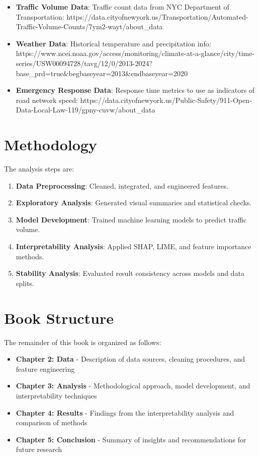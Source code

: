 \documentclass[
  letterpaper,
  DIV=11,
  numbers=noendperiod]{scrreprt}
\providecommand{\tightlist}{%
  \setlength{\itemsep}{0pt}\setlength{\parskip}{0pt}}\usepackage{longtable,booktabs,array}
\begin{document}
\begin{itemize}
\tightlist
\item
  \textbf{Traffic Volume Data}: Traffic count data from NYC Department
  of Transportation:
  https://data.cityofnewyork.us/Transportation/Automated-Traffic-Volume-Counts/7ym2-wayt/about\_data
\item
  \textbf{Weather Data}: Historical temperature and precipitation info:
  https://www.ncei.noaa.gov/access/monitoring/climate-at-a-glance/city/time-series/USW00094728/tavg/12/0/2013-2024?base\_prd=true\&begbaseyear=2013\&endbaseyear=2020
\item
  \textbf{Emergency Response Data}: Response time metrics to use as
  indicators of road network speed:
  https://data.cityofnewyork.us/Public-Safety/911-Open-Data-Local-Law-119/gpny-cuvw/about\_data
\end{itemize}

\section{Methodology}\label{methodology}

The analysis steps are:

\begin{enumerate}
\def\labelenumi{\arabic{enumi}.}
\tightlist
\item
  \textbf{Data Preprocessing}: Cleaned, integrated, and engineered
  features.
\item
  \textbf{Exploratory Analysis}: Generated visual summaries and
  statistical checks.
\item
  \textbf{Model Development}: Trained machine learning models to predict
  traffic volume.
\item
  \textbf{Interpretability Analysis}: Applied SHAP, LIME, and feature
  importance methods.
\item
  \textbf{Stability Analysis}: Evaluated result consistency across
  models and data splits.
\end{enumerate}

\section{Book Structure}\label{book-structure}

The remainder of this book is organized as follows:

\begin{itemize}
\tightlist
\item
  \textbf{Chapter 2: Data} - Description of data sources, cleaning
  procedures, and feature engineering
\item
  \textbf{Chapter 3: Analysis} - Methodological approach, model
  development, and interpretability techniques
\item
  \textbf{Chapter 4: Results} - Findings from the interpretability
  analysis and comparison of methods
\item
  \textbf{Chapter 5: Conclusion} - Summary of insights and
  recommendations for future research
\end{itemize}
\end{document}

